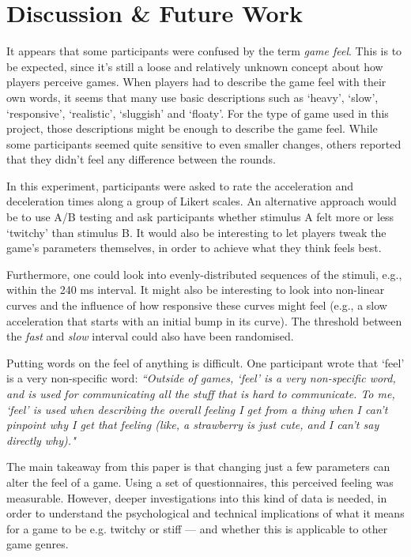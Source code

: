 \section{Discussion \& Future Work} \label{discussion}
It appears that some participants were confused by the term \textit{game feel}. This is to be expected, since it's still a loose and relatively unknown concept about how players perceive games. When players had to describe the game feel with their own words, it seems that many use basic descriptions such as `heavy', `slow', `responsive', `realistic', `sluggish' and `floaty'. For the type of game used in this project, those descriptions might be enough to describe the game feel. While some participants seemed quite sensitive to even smaller changes, others reported that they didn't feel any difference between the rounds.

In this experiment, participants were asked to rate the acceleration and deceleration times along a group of Likert scales. An alternative approach would be to use A/B testing and ask participants whether stimulus A felt more or less `twitchy' than stimulus B. It would also be interesting to let players tweak the game's parameters themselves, in order to achieve what they think feels best.

Furthermore, one could look into evenly-distributed sequences of the stimuli, e.g., within the 240 ms interval. It might also be interesting to look into non-linear curves and the influence of how responsive these curves might feel (e.g., a slow acceleration that starts with an initial bump in its curve). The threshold between the \textit{fast} and \textit{slow} interval could also have been randomised.

Putting words on the feel of anything is difficult. One participant wrote that `feel' is a very non-specific word: \textit{``Outside of games, `feel' is a very non-specific word, and is used for communicating all the stuff that is hard to communicate. To me, `feel' is used when describing the overall feeling I get from a thing when I can't pinpoint why I get that feeling (like, a strawberry is just cute, and I can't say directly why)."}

The main takeaway from this paper is that changing just a few parameters can alter the feel of a game. Using a set of questionnaires, this perceived feeling was measurable. However, deeper investigations into this kind of data is needed, in order to understand the psychological and technical implications of what it means for a game to be e.g. twitchy or stiff --- and whether this is applicable to other game genres.

